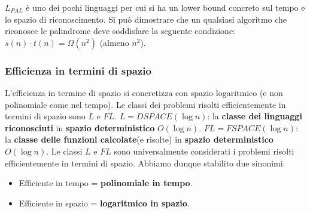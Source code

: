 \documentclass{article}
\begin{document}
$L_{PAL}$ è uno dei pochi linguaggi per cui si ha un lower bound concreto sul
tempo e lo spazio di riconoscimento. Si può dimostrare che un qualsiasi algoritmo
che riconosce le palindrome deve soddisfare la
seguente condizione: $s(n)\cdot t(n)=\Omega(n^2)$ (almeno $n^2$).

\subsubsection{Efficienza in termini di spazio}
L'efficienza in termine di spazio si concretizza con spazio logaritmico (e non polinomiale
come nel tempo). Le classi dei problemi risolti efficientemente in termini di spazio sono $L$
e $FL$.\newline\newline
$L=DSPACE(\log n)$: la \textbf{classe dei linguaggi riconosciuti} in \textbf{spazio deterministico} $O(\log n)$.
\newline\newline
$FL=FSPACE(\log n)$: la \textbf{classe delle funzioni calcolate}(e risolte) in \textbf{spazio deterministico}
$O(\log n)$.\newline\newline
Le classi $L$ e $FL$ sono universalmente considerati i problemi risolti efficientemente in termini
di spazio. Abbiamo dunque stabilito due sinonimi:
\begin{itemize}
    \item Efficiente in tempo = \textbf{polinomiale in tempo}.
    \item Efficiente in spazio = \textbf{logaritmico in spazio}.
\end{itemize}
\end{document}
